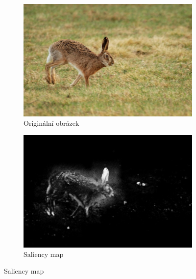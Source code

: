 \begin{figure}[H]
    \centering
    \begin{subfigure}{0.4\textwidth}
      \centering
      \includegraphics[scale=1.0]{obrazky/ORIGzajic6.jpg}
      \caption{Originální obrázek}
    \end{subfigure}
    \begin{subfigure}{0.4\textwidth}
      \centering
      \includegraphics[scale=1.0]{obrazky/StentifordSMzajic6.jpg}
      \caption{Saliency map}
    \end{subfigure}
    \vspace{2pt}
    

\end{figure}
